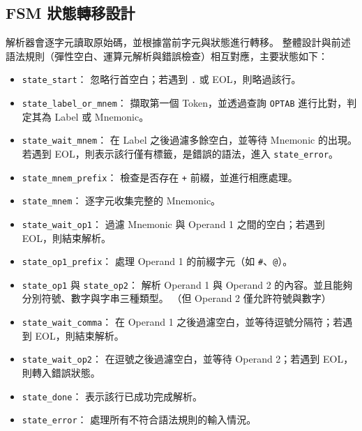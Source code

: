 \subsection{FSM 狀態轉移設計}

解析器會逐字元讀取原始碼，並根據當前字元與狀態進行轉移。
整體設計與前述語法規則（彈性空白、運算元解析與錯誤檢查）相互對應，主要狀態如下：

\begin{itemize}
    \item \lstinline{state_start}：
          忽略行首空白；若遇到 \lstinline{.} 或 EOL，則略過該行。

    \item \lstinline{state_label_or_mnem}：
          擷取第一個 Token，並透過查詢 \lstinline{OPTAB} 進行比對，判定其為 Label 或 Mnemonic。

    \item \lstinline{state_wait_mnem}：
          在 Label 之後過濾多餘空白，並等待 Mnemonic 的出現。
          若遇到 EOL，則表示該行僅有標籤，是錯誤的語法，進入 \lstinline{state_error}。

    \item \lstinline{state_mnem_prefix}：
          檢查是否存在 \lstinline{+} 前綴，並進行相應處理。

    \item \lstinline{state_mnem}：
          逐字元收集完整的 Mnemonic。

    \item \lstinline{state_wait_op1}：
          過濾 Mnemonic 與 Operand 1 之間的空白；若遇到 EOL，則結束解析。

    \item \lstinline{state_op1_prefix}：
          處理 Operand 1 的前綴字元（如 \lstinline{#}、\lstinline{@}）。

    \item \lstinline{state_op1} 與 \lstinline{state_op2}：
          解析 Operand 1 與 Operand 2 的內容。並且能夠分別符號、數字與字串三種類型。
          （但 Operand 2 僅允許符號與數字）

    \item \lstinline{state_wait_comma}：
          在 Operand 1 之後過濾空白，並等待逗號分隔符；若遇到 EOL，則結束解析。

    \item \lstinline{state_wait_op2}：
          在逗號之後過濾空白，並等待 Operand 2；若遇到 EOL，則轉入錯誤狀態。

    \item \lstinline{state_done}：
          表示該行已成功完成解析。

    \item \lstinline{state_error}：
          處理所有不符合語法規則的輸入情況。
\end{itemize}

